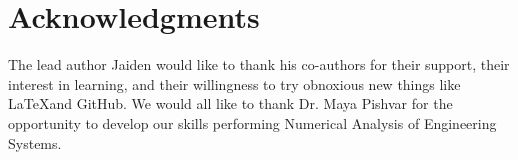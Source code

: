 \section{Acknowledgments}

The lead author Jaiden would like to thank his co-authors for their support, their interest in learning, and their willingness to try obnoxious new things like \LaTeX and GitHub. We would all like to thank Dr. Maya Pishvar for the opportunity to develop our skills performing Numerical Analysis of Engineering Systems.
